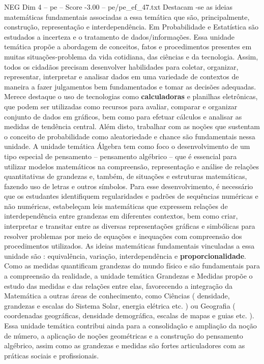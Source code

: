 \begin{textsample}{NEG Dim 4 – pe – Score -3.00 – pe/pe\_ef\_47.txt}
Destacam -se as ideias matemáticas fundamentais associadas a essa temática que são, principalmente, construção, representação e interdependência.
Em Probabilidade e Estatística são estudados a incerteza e o tratamento de dados/informações.
Essa unidade temática propõe a abordagem de conceitos, fatos e procedimentos presentes em muitas situações-problema da vida cotidiana, das ciências e da tecnologia.
Assim, todos os cidadãos precisam desenvolver habilidades para coletar, organizar, representar, interpretar e analisar dados em uma variedade de contextos de maneira a fazer julgamentos bem fundamentados e tomar as decisões adequadas.
Merece destaque o uso de tecnologias como \textbf{calculadoras} e planilhas eletrônicas, que podem ser utilizadas como recursos para avaliar, comparar e organizar conjunto de dados em gráficos, bem como para efetuar cálculos e analisar as medidas de tendência central.
Além disto, trabalhar com as noções que sustentam o conceito de probabilidade como aleatoriedade e chance são fundamentais nessa unidade.
A unidade temática Álgebra tem como foco o desenvolvimento de um tipo especial de pensamento – pensamento algébrico – que é essencial para utilizar modelos matemáticos na compreensão, representação e análise de relações quantitativas de grandezas e, também, de situações e estruturas matemáticas, fazendo uso de letras e outros símbolos.
Para esse desenvolvimento, é necessário que os estudantes identifiquem regularidades e padrões de sequências numéricas e não numéricas, estabeleçam leis matemáticas que expressem relações de interdependência entre grandezas em diferentes contextos, bem como criar, interpretar e transitar entre as diversas representações gráficas e simbólicas para resolver problemas por meio de equações e inequações com compreensão dos procedimentos utilizados.
As ideias matemáticas fundamentais vinculadas a essa unidade são : equivalência, variação, interdependência e \textbf{proporcionalidade}.
Como as medidas quantificam grandezas do mundo físico e são fundamentais para a compreensão da realidade, a unidade temática Grandezas e Medidas propõe o estudo das medidas e das relações entre elas, favorecendo a integração da Matemática a outras áreas de conhecimento, como Ciências ( densidade, grandezas e escalas do Sistema Solar, energia elétrica etc. ) ou Geografia ( coordenadas geográficas, densidade demográfica, escalas de mapas e guias etc. ).
Essa unidade temática contribui ainda para a consolidação e ampliação da noção de número, a aplicação de noções geométricas e a construção do pensamento algébrico, assim como as grandezas e medidas são fortes articuladores com as práticas sociais e profissionais.

\end{textsample}
